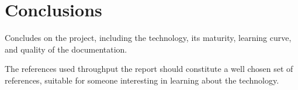\section{Conclusions}

Concludes on the project, including the technology, its maturity,
learning curve, and quality of the documentation.

The references used throughput the report should constitute a well
chosen set of references, suitable for someone interesting in learning
about the technology.
